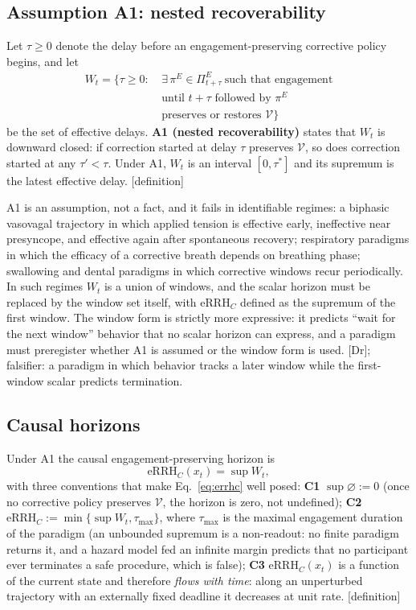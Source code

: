 \documentclass[9pt,twocolumn]{article}
\newcommand{\eRRHc}{\mathrm{eRRH}_{C}}
\newcommand{\tier}[1]{{\sffamily\scriptsize\color{RRHMSlate}[#1]}}
\newcommand{\Vset}{\mathcal{V}}
\begin{document}
\subsection{Assumption A1: nested recoverability}
\label{sec:a1}
Let $\tau\ge0$ denote the delay before an engagement-preserving corrective policy begins, and let
\begin{align*}
W_t=\Big\{\tau\ge0:\ &\exists\,\pi^E\in\Pi^E_{t+\tau}\ \text{such that engagement}\\[-0.15em]
&\text{until }t+\tau\text{ followed by }\pi^E\\[-0.15em]
&\text{preserves or restores }\Vset\Big\}
\end{align*}
be the set of effective delays. \textbf{A1 (nested recoverability)} states that $W_t$ is downward closed: if correction started at delay $\tau$ preserves $\Vset$, so does correction started at any $\tau'<\tau$. Under A1, $W_t$ is an interval $[0,\tau^*]$ and its supremum is the latest effective delay. \tier{definition}

A1 is an assumption, not a fact, and it fails in identifiable regimes: a biphasic vasovagal trajectory in which applied tension is effective early, ineffective near presyncope, and effective again after spontaneous recovery; respiratory paradigms in which the efficacy of a corrective breath depends on breathing phase; swallowing and dental paradigms in which corrective windows recur periodically. In such regimes $W_t$ is a union of windows, and the scalar horizon must be replaced by the window set itself, with $\eRRHc$ defined as the supremum of the first window. The window form is strictly more expressive: it predicts ``wait for the next window'' behavior that no scalar horizon can express, and a paradigm must preregister whether A1 is assumed or the window form is used. \tier{Dr}; falsifier: a paradigm in which behavior tracks a later window while the first-window scalar predicts termination.

\subsection{Causal horizons}
Under A1 the causal engagement-preserving horizon is
\begin{equation}
\eRRHc(x_t)=\sup W_t,
\label{eq:errhc}
\end{equation}
with three conventions that make Eq.~\ref{eq:errhc} well posed: \textbf{C1} $\sup\varnothing:=0$ (once no corrective policy preserves $\Vset$, the horizon is zero, not undefined); \textbf{C2} $\eRRHc:=\min\{\sup W_t,\tau_{\max}\}$, where $\tau_{\max}$ is the maximal engagement duration of the paradigm (an unbounded supremum is a non-readout: no finite paradigm returns it, and a hazard model fed an infinite margin predicts that no participant ever terminates a safe procedure, which is false); \textbf{C3} $\eRRHc(x_t)$ is a function of the current state and therefore \emph{flows with time}: along an unperturbed trajectory with an externally fixed deadline it decreases at unit rate. \tier{definition}
\end{document}
